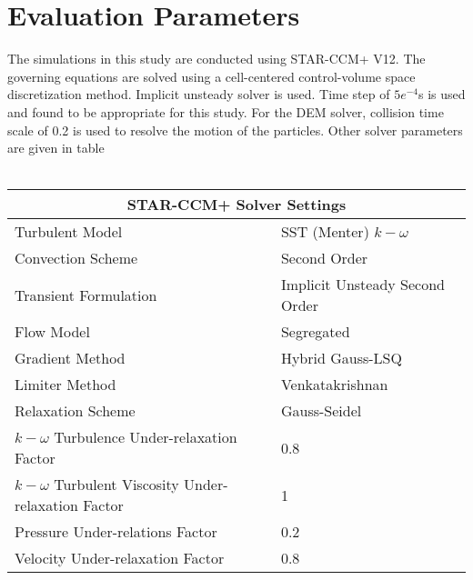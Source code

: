 \section{Evaluation Parameters}
The simulations in this study are conducted using STAR-CCM+ V12. The governing equations  are solved using a cell-centered control-volume space discretization method. Implicit unsteady solver is used. Time step of $5e^{-4}$s is used and found to be appropriate for this study. For the DEM solver, collision time scale of 0.2 is used to resolve the motion  of the particles. Other solver parameters are given in table\\ \\ 
\begin{tabular}{ |p{9cm}|p{7cm}|}
 \hline
 \multicolumn{2}{|c|}{STAR-CCM+ Solver Settings} \\
 \hline
 Turbulent Model& SST (Menter) $k-\omega$\\
 Convection Scheme & Second Order\\
 Transient Formulation & Implicit Unsteady Second Order\\
 Flow Model   & Segregated\\
 Gradient Method & Hybrid Gauss-LSQ\\
 Limiter Method & Venkatakrishnan \\
 Relaxation Scheme & Gauss-Seidel\\
 $k-\omega$ Turbulence Under-relaxation Factor & 0.8\\
 $k-\omega$ Turbulent Viscosity Under-relaxation Factor & 1\\
 Pressure Under-relations Factor & 0.2\\
 Velocity Under-relaxation Factor & 0.8\\
 \hline
\end{tabular}


























